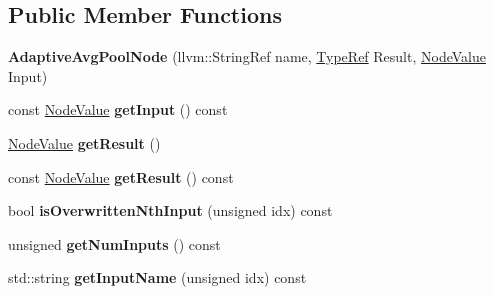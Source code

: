 \subsection*{Public Member Functions}
\begin{DoxyCompactItemize}
\item 
\mbox{\label{classglow_1_1_adaptive_avg_pool_node_a9dc69701d7d0149986116d003eeeb838}} 
{\bfseries Adaptive\+Avg\+Pool\+Node} (llvm\+::\+String\+Ref name, \hyperlink{structglow_1_1_type}{Type\+Ref} Result, \hyperlink{structglow_1_1_node_value}{Node\+Value} Input)
\item 
\mbox{\label{classglow_1_1_adaptive_avg_pool_node_a97d16adf4fec70c960771292ae016403}} 
const \hyperlink{structglow_1_1_node_value}{Node\+Value} {\bfseries get\+Input} () const
\item 
\mbox{\label{classglow_1_1_adaptive_avg_pool_node_a861853fc8a0bc55e1863e666a99daf4f}} 
\hyperlink{structglow_1_1_node_value}{Node\+Value} {\bfseries get\+Result} ()
\item 
\mbox{\label{classglow_1_1_adaptive_avg_pool_node_ada7b7a492da56c4b190176f03c014501}} 
const \hyperlink{structglow_1_1_node_value}{Node\+Value} {\bfseries get\+Result} () const
\item 
\mbox{\label{classglow_1_1_adaptive_avg_pool_node_a3630eabf7a039b301993d319935464f1}} 
bool {\bfseries is\+Overwritten\+Nth\+Input} (unsigned idx) const
\item 
\mbox{\label{classglow_1_1_adaptive_avg_pool_node_a92ae38f1b02343ffdfc81ee2f3dc298b}} 
unsigned {\bfseries get\+Num\+Inputs} () const
\item 
\mbox{\label{classglow_1_1_adaptive_avg_pool_node_a4b9b6f4fdb38042c4f595d7b6e26236b}} 
std\+::string {\bfseries get\+Input\+Name} (unsigned idx) const
\item 
\mbox{\label{classglow_1_1_adaptive_avg_pool_node_a38799ee7fe7c672a2456f4e62febde95}} 

\end{DoxyCompactItemize}
